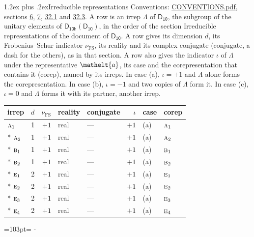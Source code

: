 \documentclass[10pt,a4paper]{article}
\makeatletter
\renewcommand\section{\@startsection{section}{1}{\z@}{-3ex plus -1ex minus -.2ex}%
  {1.2ex plus .2ex}{\normalfont\large\sffamily\bfseries\color{parttitle}}}
\newcommand{\needspace}[1]{\par\penalty-100\begingroup\dimen0=#1\relax\dimen2=\pagegoal
  \advance\dimen2-\pagetotal\ifdim\dimen0>\dimen2\relax\ifdim\dimen2>0pt\vfil\break\fi\fi
  \endgroup}
\numberwithin{equation}{section}
\newcommand{\eltfont}[1]{{\let\sigma\eltsigma\mathelt{#1}}}
\newcommand{\grp}[1]{\mathsf{#1}}
\newcommand{\irr}[1]{\text{\normalfont\scshape #1}}
\newcommand{\elt}[1]{\eltfont{#1}}
\newcommand{\fsind}{\nu_{\mathrm{FS}}}
\makeatother
\begin{document}
\section{Irreducible representations}\label{s:irreps}
Conventions: \href{../../CONVENTIONS.pdf}{CONVENTIONS.pdf}, sections \href{../../../rotation/CONVENTIONS.pdf\#conv.6}{6}, \href{../../../rotation/CONVENTIONS.pdf\#conv.7}{7}, \href{../../CONVENTIONS.pdf\#conv.32.1}{32.1} and \href{../../CONVENTIONS.pdf\#conv.32.3}{32.3}.
\leavevmode\label{n:irrep.Delta}A row is an irrep $\Lambda$ of $\grp{D_{10}}$, the subgroup of the unitary elements of $\grp{D_{10h}}(\grp{D_{10}})$, in the order of the section Irreducible representations of the document of \href{../../../rotation/data/pdf/D10.pdf}{$\grp{D_{10}}$}. \label{n:index.dimension}\label{n:index.frobenius}\label{n:head.irrep}\label{n:head.reality}\label{n:head.conjugate}A row gives its dimension $d$, its Frobenius--Schur indicator $\fsind$, its reality and its complex conjugate (conjugate, a dash for the others), as in that section. \label{n:head.case.corep}\label{n:head.corep}A row also gives the indicator $\iota$ of $\Lambda$ under the representative $\elt{a}$, its case and the corepresentation that contains it (corep), named by its irreps. In case (a), $\iota = +1$ and $\Lambda$ alone forms the corepresentation. In case (b), $\iota = -1$ and two copies of $\Lambda$ form it. In case (c), $\iota = 0$ and $\Lambda$ forms it with its partner, another irrep.
\setlength{\emergencystretch}{2em}\par\setlength{\emergencystretch}{0pt}
{\small\renewcommand{\arraystretch}{1.25}\setlength{\tabcolsep}{4pt}\begin{longtable}{@{}lrrllrll@{}}\toprule
irrep & $d$ & $\fsind$ & reality & conjugate & $\iota$ & case & corep\\\midrule\endhead
\bottomrule\endfoot\endlastfoot
$\irr{a}_{1}$ & 1 & $+1$ & real & --- & $+1$ & (a) & $\irr{a}_{1}$\\*
$\irr{a}_{2}$ & 1 & $+1$ & real & --- & $+1$ & (a) & $\irr{a}_{2}$\\*
$\irr{b}_{1}$ & 1 & $+1$ & real & --- & $+1$ & (a) & $\irr{b}_{1}$\\*
$\irr{b}_{2}$ & 1 & $+1$ & real & --- & $+1$ & (a) & $\irr{b}_{2}$\\*
$\irr{e}_{1}$ & 2 & $+1$ & real & --- & $+1$ & (a) & $\irr{e}_{1}$\\*
$\irr{e}_{2}$ & 2 & $+1$ & real & --- & $+1$ & (a) & $\irr{e}_{2}$\\*
$\irr{e}_{3}$ & 2 & $+1$ & real & --- & $+1$ & (a) & $\irr{e}_{3}$\\*
$\irr{e}_{4}$ & 2 & $+1$ & real & --- & $+1$ & (a) & $\irr{e}_{4}$\\
\bottomrule\end{longtable}}
\needspace{103pt}
\end{document}
